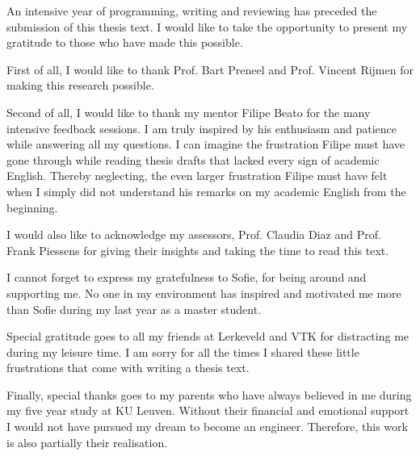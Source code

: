 \documentclass[master=eelt,masteroption=em]{kulemt}
\theoremstyle{plain}
\theoremstyle{definition}
\begin{document}
\begin{preface}
An intensive year of programming, writing and reviewing has preceded the submission of this thesis text. I would like to take the opportunity to present my gratitude to those who have made this possible. 

First of all, I would like to thank Prof. Bart Preneel and Prof. Vincent Rijmen for making this research possible.

Second of all, I would like to thank my mentor Filipe Beato for the many intensive feedback sessions. I am truly inspired by his enthusiasm and patience while answering all my questions. I can imagine the frustration Filipe must have gone through while reading thesis drafts that lacked every sign of academic English. Thereby neglecting, the even larger frustration Filipe must have felt when I simply did not understand his remarks on my academic English from the beginning.

I would also like to acknowledge my assessors, Prof. Claudia Diaz and Prof. Frank Piessens for giving their insights and taking the time to read this text.

I cannot forget to express my gratefulness to Sofie, for being around and supporting me. No one in my environment has inspired and motivated me more than Sofie during my last year as a master student.

Special gratitude goes to all my friends at Lerkeveld and VTK for distracting me during my leisure time. I am sorry for all the times I shared these little frustrations that come with writing a thesis text.

Finally, special thanks goes to my parents who have always believed in me during my five year study at KU Leuven. Without their financial and emotional support I would not have pursued my dream to become an engineer. Therefore, this work is also partially their realisation.

\end{preface}

\tableofcontents*
\end{document}
